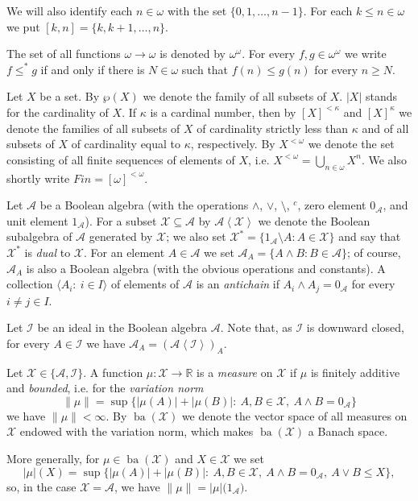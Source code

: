 \documentclass[a4paper,11pt,fleqn]{amsart}
\theoremstyle{definition}
\theoremstyle{remark}
\numberwithin{equation}{section}
\newcommand{\N}{\mathbb{N}}
\newcommand{\R}{\mathbb{R}}
\newcommand{\aA}{\mathcal{A}}
\newcommand{\iI}{\mathcal{I}}
\newcommand{\xX}{\mathcal{X}}
\DeclareMathOperator{\ba}{ba}
\newcommand{\sm}{\setminus}
\newcommand{\sub}{\subseteq}
\newcommand{\seq}[2]{\big\langle#1\colon\ #2\big\rangle}
\newcommand{\gen}[1]{\mathopen{}\left\langle#1\mathclose{}\right\rangle}
\newcommand{\finsub}[1]{\left[#1\right]^{<\omega}}
\newcommand{\io}{\in\omega}%
\newcommand{\fso}{\finsub{\omega}}%
\begin{document}
We will also identify each $n\io$ with the set $\{0,1,\ldots,n-1\}$. For each $k\le n\io$ we put $[k,n]=\{k,k+1,\ldots,n\}$.

The set of all functions $\omega\to\omega$ is denoted by $\omega^\omega$. For every $f,g\in\omega^\omega$ we write $f\le^*g$ if and only if there is $N\io$ such that $f(n)\le g(n)$ for every $n\ge N$.

Let $X$ be a set. By $\wp(X)$ we denote the family of all subsets of $X$. $|X|$ stands for the cardinality of $X$. If $\kappa$ is a cardinal number, then by $[X]^{<\kappa}$ and $[X]^{\kappa}$ we denote the families of all subsets of $X$ of cardinality strictly less than $\kappa$ and of all subsets of $X$ of cardinality equal to $\kappa$, respectively. By $X^{<\omega}$ we denote the set consisting of all finite sequences of elements of $X$, i.e. $X^{<\omega}=\bigcup_{n\io}X^n$. We also shortly write $Fin=\fso$.

\medskip

Let $\aA$ be a Boolean algebra (with the operations $\wedge$, $\vee$, $\setminus$, $^c$, zero element $0_\aA$, and unit element $1_\aA$). For a subset $\xX\sub\aA$ by $\aA\gen{\xX}$ we denote the Boolean subalgebra of $\aA$ generated by $\xX$; we also set $\xX^*=\big\{1_\aA\sm A\colon A\in\xX\}$ and say that $\xX^*$ is \textit{dual} to $\xX$. For an element $A\in\aA$ we set $\aA_A=\{A\wedge B\colon B\in\aA\}$; of course, $\aA_A$ is also a Boolean algebra (with the obvious operations and constants). A collection $\seq{A_i}{i\in I}$ of elements of $\aA$ is an \textit{antichain} if $A_i\wedge A_j=0_\aA$ for every $i\neq j\in I$. 

Let $\iI$ be an ideal in the Boolean algebra $\aA$. Note that, as $\iI$ is downward closed, for every $A\in\iI$ we have $\aA_A=(\aA\gen{\iI})_A$. 

Let $\xX\in\{\aA,\iI\}$. A function $\mu\colon\xX\to\R$ is a \textit{measure} on $\xX$ if $\mu$ is finitely additive and \textit{bounded}, i.e. for the \textit{variation norm}
\[\|\mu\|=\sup\big\{|\mu(A)|+|\mu(B)|\colon\ A,B\in\xX,\ A\wedge B=0_\aA\big\}\]
we have $\|\mu\|<\infty$. By $\ba(\xX)$ we denote the vector space of all measures on $\xX$ endowed with the variation norm, which makes $\ba(\xX)$ a Banach space.

More generally, for $\mu\in\ba(\xX)$ and $X\in\xX$ we set
\[|\mu|(X)=\sup\big\{|\mu(A)|+|\mu(B)|\colon\ A,B\in\xX,\ A\wedge B=0_\aA,\ A\vee B\le X\big\},\]
so, in the case $\xX=\aA$, we have $\|\mu\|=|\mu|\big(1_\aA\big)$.
\end{document}
